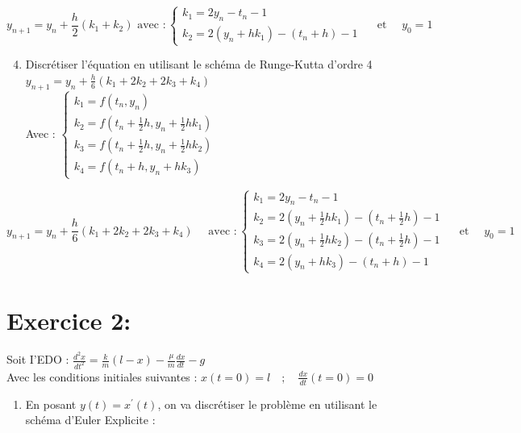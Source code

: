 \documentclass[10pt]{article}
\begin{document}
\[
y_{n+1}=y_{n}+\frac{h}{2}\left(k_{1}+k_{2}\right) \text { avec }:\left\{\begin{array}{c}
k_{1}=2 y_{n}-t_{n}-1 \\
k_{2}=2\left(y_{n}+h k_{1}\right)-\left(t_{n}+h\right)-1
\end{array} \quad \text { et } \quad y_{0}=1\right.
\]

\begin{enumerate}
  \setcounter{enumi}{3}
  \item Discrétiser l'équation en utilisant le schéma de Runge-Kutta d'ordre 4\\
\(y_{n+1}=y_{n}+\frac{h}{6}\left(k_{1}+2 k_{2}+2 k_{3}+k_{4}\right)\)\\
Avec : \(\left\{\begin{array}{c}k_{1}=f\left(t_{n}, y_{n}\right) \\ k_{2}=f\left(t_{n}+\frac{1}{2} h, y_{n}+\frac{1}{2} h k_{1}\right) \\ k_{3}=f\left(t_{n}+\frac{1}{2} h, y_{n}+\frac{1}{2} h k_{2}\right) \\ k_{4}=f\left(t_{n}+h, y_{n}+h k_{3}\right)\end{array}\right.\)
\end{enumerate}

\[
y_{n+1}=y_{n}+\frac{h}{6}\left(k_{1}+2 k_{2}+2 k_{3}+k_{4}\right) \quad \text { avec }:\left\{\begin{array}{c}
k_{1}=2 y_{n}-t_{n}-1 \\
k_{2}=2\left(y_{n}+\frac{1}{2} h k_{1}\right)-\left(t_{n}+\frac{1}{2} h\right)-1 \\
k_{3}=2\left(y_{n}+\frac{1}{2} h k_{2}\right)-\left(t_{n}+\frac{1}{2} h\right)-1 \\
k_{4}=2\left(y_{n}+h k_{3}\right)-\left(t_{n}+h\right)-1
\end{array} \quad \text { et } \quad y_{0}=1\right.
\]

\section*{Exercice 2:}
Soit I'EDO : \(\frac{d^{2} x}{d t^{2}}=\frac{k}{m}(l-x)-\frac{\mu}{m} \frac{d x}{d t}-g\)\\
Avec les conditions initiales suivantes : \(x(t=0)=l \quad ; \quad \frac{d x}{d t}(t=0)=0\)

\begin{enumerate}
  \item En posant \(y(t)=x^{\prime}(t)\), on va discrétiser le problème en utilisant le schéma d'Euler Explicite :
\end{enumerate}
\end{document}
